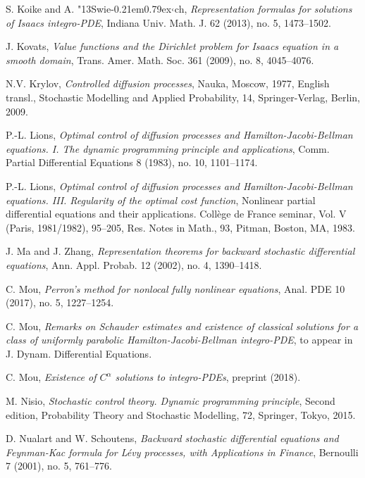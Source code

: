 \documentclass[amscd,amssymb,11pt]{article}
\numberwithin{theorem}{section}
\numberwithin{equation}{section}
\def\Swiech{{\accent"13S}wie{\hbox{\kern -0.21em\lower 0.79ex\hbox{$\textfont1=\scriptfont1\lhook$}}}ch}
\begin{document}
\begin{thebibliography}{99}
 S. Koike and A. \Swiech, {\it Representation formulas for solutions of Isaacs integro-PDE}, Indiana Univ. Math. J. 62 (2013), no. 5, 1473--1502.

J. Kovats, {\it Value functions and the Dirichlet problem for Isaacs equation in a smooth domain}, Trans. Amer. Math. Soc. 361 (2009), no. 8, 4045--4076.

N.V. Krylov, {\it Controlled diffusion processes}, Nauka, Moscow, 1977, English transl., Stochastic Modelling and Applied Probability, 14, Springer-Verlag, Berlin, 2009.

P.-L. Lions,
{\it Optimal control of diffusion processes and Hamilton-Jacobi-Bellman equations. I. The dynamic programming principle and applications},
Comm. Partial Differential Equations 8 (1983), no. 10, 1101--1174.

P.-L. Lions,
{\it Optimal control of diffusion processes and Hamilton-Jacobi-Bellman equations. III. Regularity of the optimal cost function}, Nonlinear partial differential equations and their applications. Coll\`ege de France seminar, Vol. V (Paris, 1981/1982),
95--205,
Res. Notes in Math., 93, Pitman, Boston, MA, 1983.

J. Ma and J. Zhang, {\it Representation theorems for backward stochastic differential equations}, Ann. Appl. Probab. 12 (2002), no. 4, 1390--1418.

 C. Mou, {\it Perron's method for nonlocal fully nonlinear equations}, Anal. PDE 10 (2017), no. 5, 1227--1254.


 C. Mou, {\it Remarks on Schauder estimates and existence of classical solutions for a class of uniformly parabolic Hamilton-Jacobi-Bellman integro-PDE}, to appear in J. Dynam. Differential Equations.

 C. Mou, {\it Existence of $C^\alpha$ solutions to integro-PDEs}, preprint (2018).


M. Nisio, {\it Stochastic control theory. Dynamic programming principle}, Second edition, Probability Theory and Stochastic Modelling, 72, Springer, Tokyo, 2015.


 D. Nualart and W. Schoutens, {\it Backward stochastic differential equations and Feynman-Kac formula for L\'{e}vy processes, with Applications in Finance}, Bernoulli 7 (2001), no. 5, 761--776.



\end{thebibliography}
\end{document}
